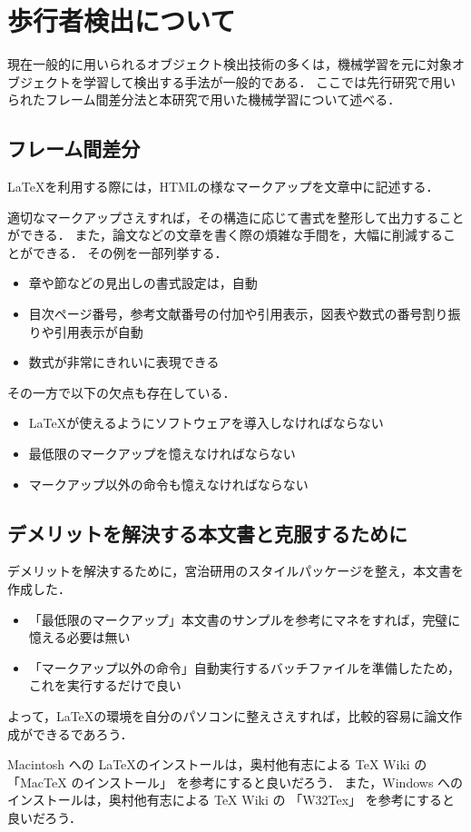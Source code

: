 \section{歩行者検出について}
現在一般的に用いられるオブジェクト検出技術の多くは，機械学習を元に対象オブジェクトを学習して検出する手法が一般的である．
ここでは先行研究で用いられたフレーム間差分法と本研究で用いた機械学習について述べる．


\subsection{フレーム間差分}

\LaTeX を利用する際には，HTMLの様なマークアップを文章中に記述する．

適切なマークアップさえすれば，その構造に応じて書式を整形して出力することができる．
また，論文などの文章を書く際の煩雑な手間を，大幅に削減することができる．
その例を一部列挙する．
\begin{itemize}
\item 章や節などの見出しの書式設定は，自動
\item 目次ページ番号，参考文献番号の付加や引用表示，図表や数式の番号割り振りや引用表示が自動
\item 数式が非常にきれいに表現できる
\end{itemize}

その一方で以下の欠点も存在している．
\begin{itemize}
\item \LaTeX が使えるようにソフトウェアを導入しなければならない
\item 最低限のマークアップを憶えなければならない
\item マークアップ以外の命令も憶えなければならない
\end{itemize}


\subsection{デメリットを解決する本文書と克服するために}
デメリットを解決するために，宮治研用のスタイルパッケージを整え，本文書を作成した．

\begin{itemize}
\item 「最低限のマークアップ」本文書のサンプルを参考にマネをすれば，完璧に憶える必要は無い
\item 「マークアップ以外の命令」自動実行するバッチファイルを準備したため，これを実行するだけで良い
\end{itemize}

よって，\LaTeX の環境を自分のパソコンに整えさえすれば，比較的容易に論文作成ができるであろう．

Macintosh への \LaTeX のインストールは，奥村他有志による TeX Wiki の 「MacTeX のインストール」\cite{mactex} を参考にすると良いだろう．
また，Windows へのインストールは，奥村他有志による TeX Wiki の 「W32Tex」\cite{w32tex} を参考にすると良いだろう．
